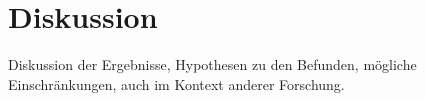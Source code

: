 \chapter{Diskussion}\label{ch:4}

Diskussion der Ergebnisse, Hypothesen zu den Befunden, mögliche Einschränkungen, auch im Kontext anderer Forschung.
